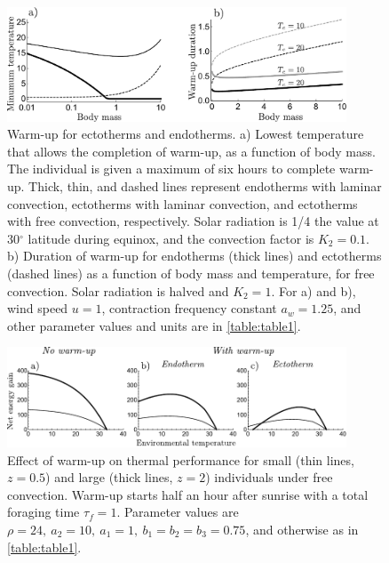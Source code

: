 \begin{figure}
\centering \includegraphics[width=0.9\textwidth]{fig3}
\caption{
    \setstretch{\stretchby}
	Warm-up for ectotherms and endotherms.
	a) Lowest temperature that allows the completion of warm-up, as a function of body mass.
	The individual is given a maximum of six hours to complete warm-up.
    Thick, thin, and dashed lines represent endotherms with laminar convection, ectotherms with laminar convection, and ectotherms with free convection, respectively.  %
    Solar radiation is 1/4 the value at 30$^\circ$ latitude during equinox, and the convection factor is $K_2 = 0.1$.
    b) Duration of warm-up for endotherms (thick lines) and ectotherms (dashed lines) as a function of body mass and temperature, for free convection.
    Solar radiation is halved and $K_2 = 1$.
    For a) and b), wind speed $u = 1$, contraction frequency constant $a_w = 1.25$, and other parameter values and units are in \cref{table:table1}.
}
\label{fig3}
\end{figure}

\begin{figure}
\centering \includegraphics[width=0.9\textwidth]{fig4}
\caption{
    \setstretch{\stretchby}
    Effect of warm-up on thermal performance for small (thin lines, $z = 0.5$) and large (thick lines, $z = 2$) individuals under free convection.
    Warm-up starts half an hour after sunrise with a total foraging time $\tau_f = 1$.
    Parameter values are $\rho = 24,\ a_2 = 10,\ a_1 = 1, \ b_1 = b_2 = b_3 = 0.75$, and otherwise as in \cref{table:table1}.
}
\label{fig4}
\end{figure}

